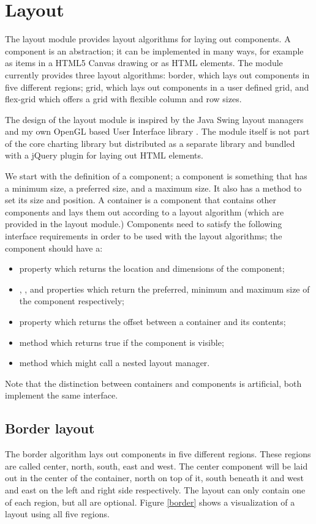 \section{Layout}
The layout module provides layout algorithms for laying out components. A component is an abstraction; it can be implemented in many ways, for example as items in a HTML5 Canvas drawing or as HTML elements. The module currently provides three layout algorithms: border, which lays out components in five different regions; grid, which lays out components in a user defined grid, and flex-grid which offers a grid with flexible column and row sizes.

The design of the layout module is inspired by the Java Swing layout managers \cite{sun08} and my own OpenGL based User Interface library \cite{stein06}. The module itself is not part of the core charting library but distributed as a separate library \cite{stein08} and bundled with a jQuery plugin for laying out HTML elements.

We start with the definition of a component; a component is something that has a minimum size, a preferred size, and a maximum size. It also has a method to set its size and position. A container is a component that contains other components and lays them out according to a layout algorithm (which are provided in the layout module.) Components need to satisfy the following interface requirements in order to be used with the layout algorithms; the component should have a:
\begin{itemize}
\item {} property which returns the location and dimensions of the component;
\item {}, , and  properties which return the preferred, minimum and maximum size of the component respectively;
\item {} property which returns the offset between a container and its contents;
\item {} method which returns true if the component is visible;
\item {} method which might call a nested layout manager.
\end{itemize}

Note that the distinction between containers and components is artificial, both implement the same interface. 

\subsection{Border layout}
The border algorithm lays out components in five different regions. These regions are called center, north, south, east and west. The center component will be laid out in the center of the container, north on top of it, south beneath it and west and east on the left and right side respectively. The layout can only contain one of each region, but all are optional. Figure \ref{border} shows a visualization of a layout using all five regions. 

